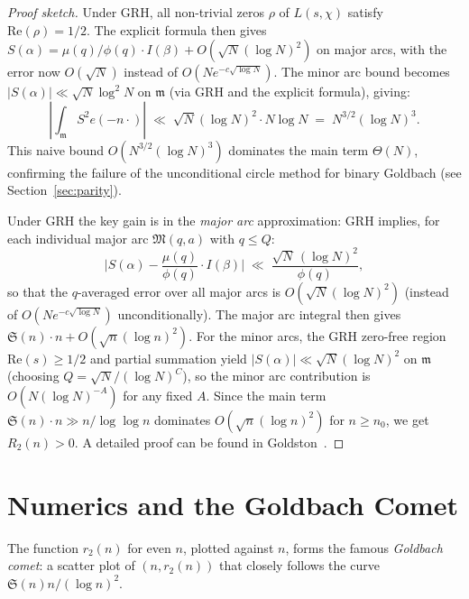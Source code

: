 \documentclass[12pt,a4paper]{amsart}
\theoremstyle{definition}
\newcommand{\eq}[1]{e\!\left(#1\right)}
\begin{document}
\begin{proof}[Proof sketch]
  Under GRH, all non-trivial zeros $\rho$ of $L(s,\chi)$ satisfy
  $\text{Re}(\rho) = 1/2$.  The explicit formula then gives
  $S(\alpha) = \mu(q)/\phi(q) \cdot I(\beta) + O(\sqrt{N} (\log N)^2)$
  on major arcs, with the error now $O(\sqrt{N})$ instead of
  $O(N e^{-c\sqrt{\log N}})$.  The minor arc bound becomes
  $|S(\alpha)| \ll \sqrt{N} \log^2 N$ on $\mathfrak{m}$ (via GRH and
  the explicit formula), giving:
  \[
    \left|\int_{\mathfrak{m}} S^2 \eq{-n\cdot}\right|
    \;\ll\; \sqrt{N} (\log N)^2 \cdot N \log N \;=\; N^{3/2} (\log N)^3.
  \]
  This naive bound $O(N^{3/2}(\log N)^3)$ dominates the main term $\Theta(N)$,
  confirming the failure of the unconditional circle method for binary Goldbach
  (see Section~\ref{sec:parity}).

  Under GRH the key gain is in the \emph{major arc} approximation:
  GRH implies, for each individual major arc $\mathfrak{M}(q,a)$ with $q \leq Q$:
  \[
    \bigl|S(\alpha) - \frac{\mu(q)}{\phi(q)}\cdot I(\beta)\bigr|
    \;\ll\; \frac{\sqrt{N}\,(\log N)^2}{\phi(q)},
  \]
  so that the $q$-averaged error over all major arcs is $O(\sqrt{N}(\log N)^2)$
  (instead of $O(Ne^{-c\sqrt{\log N}})$ unconditionally).  The major arc integral then gives
  $\mathfrak{S}(n)\cdot n + O(\sqrt{n}(\log n)^2)$.
  For the minor arcs, the GRH zero-free region $\mathrm{Re}(s)\geq 1/2$ and
  partial summation yield $|S(\alpha)| \ll \sqrt{N}(\log N)^2$ on $\mathfrak{m}$
  (choosing $Q = \sqrt{N}/(\log N)^C$), so the minor arc contribution is
  $O(N(\log N)^{-A})$ for any fixed $A$.  Since the main term $\mathfrak{S}(n)\cdot n
  \gg n/\log\log n$ dominates $O(\sqrt{n}(\log n)^2)$ for $n \geq n_0$, we get
  $R_2(n) > 0$.  A detailed proof can be found in Goldston~\cite{Goldston1992}.
\end{proof}

\section{Numerics and the Goldbach Comet}
\label{sec:goldbach_comet}

The function $r_2(n)$ for even $n$, plotted against $n$, forms the
famous \emph{Goldbach comet}: a scatter plot of $(n, r_2(n))$ that
closely follows the curve $\mathfrak{S}(n) n / (\log n)^2$.
\end{document}
